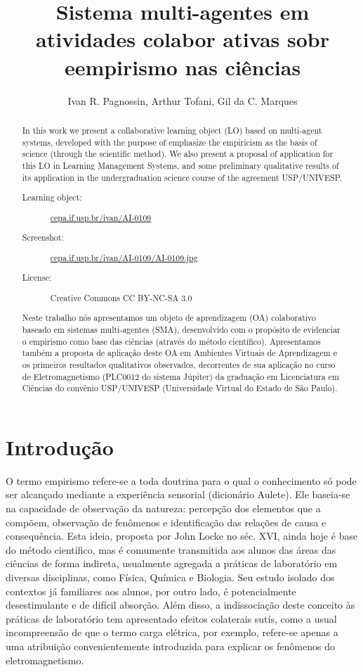 \documentclass{article}
\title{Sistema multi-agentes em atividades colabor ativas sobr eempirismo nas ciências}
\author{Ivan R. Pagnossin\inst{1}, Arthur Tofani\inst{2}, Gil da C. Marques\inst{1}}
\begin{document}
\maketitle

\begin{abstract}
In this work we present a collaborative learning object (LO) based on multi-agent systems,
developed with the purpose of emphasize the empiricism as the basis of science (through the scientific method).
We also present a proposal of application for this LO in Learning Management Systems,
and some preliminary qualitative results of its application in the undergraduation science course of the agreement USP/UNIVESP.

\begin{description}
\item[Learning object:] \url{cepa.if.usp.br/ivan/AI-0109}
\item[Screenshot:] \url{cepa.if.usp.br/ivan/AI-0109/AI-0109.jpg}
\item[License:] Creative Commons CC BY-NC-SA 3.0
\end{description}
\end{abstract}

\begin{abstract}
Neste trabalho nós apresentamos um objeto de aprendizagem (OA) colaborativo baseado em sistemas multi-agentes (SMA),
desenvolvido com o propósito de evidenciar o empirismo como base das ciências (através do método científico).
Apresentamos também a proposta de aplicação deste OA em Ambientes Virtuais de Aprendizagem e os primeiros resultados qualitativos
observados, decorrentes de sua aplicação no curso de Eletromagnetismo (PLC0012 do sistema Júpiter) da graduação em
Licenciatura em Ciências do convênio USP/UNIVESP (Universidade Virtual do Estado de São Paulo).
\end{abstract}

\section{Introdução}

O termo empirismo refere-se a toda doutrina para o qual o conhecimento só pode
ser alcançado mediante a experiência sensorial (dicionário Aulete). Ele baseia-se
na capacidade de observação da natureza: percepção dos elementos que a compõem,
observação de fenômenos e identificação das relações de causa e consequência. Esta
ideia, proposta por John Locke no séc. XVI, ainda hoje é base do método científico,
mas é comumente transmitida aos alunos das áreas das ciências de forma indireta,
usualmente agregada a práticas de laboratório em diversas disciplinas, como Física,
Química e Biologia. Seu estudo isolado dos contextos já familiares aos alunos, por outro
lado, é potencialmente desestimulante e de difícil absorção. Além disso, a indissociação
deste conceito às práticas de laboratório tem apresentado efeitos colaterais sutís,
como a usual incompreensão de que o termo carga elétrica, por exemplo, refere-se
apenas a uma atribuição convenientemente introduzida para explicar os fenômenos do
eletromagnetismo.
\end{document}
